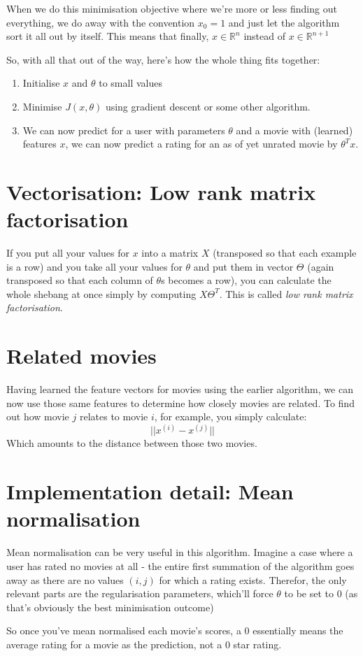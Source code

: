 When we do this minimisation objective where we're more or less finding out everything, we do away with the convention $x_0 = 1$ and just let the algorithm sort it all out by itself. This means that finally, $x \in \mathbb{R}^n$ instead of $x \in \mathbb{R}^{n + 1}$

So, with all that out of the way, here's how the whole thing fits together:

\begin{enumerate}
\item Initialise $x$ and $\theta$ to small values
\item Minimise $J(x, \theta)$ using gradient descent or some other algorithm.
\item We can now predict for a user with parameters $\theta$ and a movie with (learned) features $x$, we can now predict a rating for an as of yet unrated movie by $\theta^Tx$.
\end{enumerate}

\section{Vectorisation: Low rank matrix factorisation}
If you put all your values for $x$ into a matrix $X$ (transposed so that each example is a row) and you take all your values for $\theta$ and put them in vector $\Theta$ (again transposed so that each 	column of $\theta$s becomes a row), you can calculate the whole shebang at once simply by computing $X\Theta^T$. This is called \emph{low rank matrix factorisation}.

\section{Related movies}

Having learned the feature vectors for movies using the earlier algorithm, we can now use those same features to determine how closely movies are related. To find out how movie $j$ relates to movie $i$, for example, you simply calculate:
\[
||x^{(i)} - x^{(j)}||
\]
Which amounts to the distance between those two movies.

\section{Implementation detail: Mean normalisation}

Mean normalisation can be very useful in this algorithm. Imagine a case where a user has rated no movies at all - the entire first summation of the algorithm goes away as there are no values $(i, j)$ for which a rating exists. Therefor, the only relevant parts are the regularisation parameters, which'll force $\theta$ to be set to 0 (as that's obviously the best minimisation outcome)

So once you've mean normalised each movie's scores, a 0 essentially means the average rating for a movie as the prediction, not a 0 star rating.